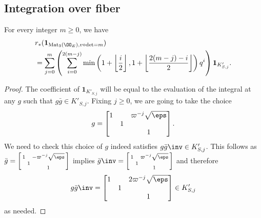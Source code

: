 \subsection{Integration over fiber}
\begin{proposition}
  For every integer $m \ge 0$, we have
  \begin{align*}
    &r_\ast(\mathbf{1}_{\Mat_3(\OO_E), v\circ\det=m}) \\
    &= \sum_{j=0}^m \left(
      \sum_{i=0}^{2(m-j)} \min \left( 1 + \left\lfloor \frac i2 \right\rfloor,
        1 + \left\lfloor \frac{2(m-j)-i}{2} \right\rfloor \right) q^i \right)
        \mathbf{1}_{K'_{S,j}}.
  \end{align*}
\end{proposition}
\begin{proof}
  The coefficient of $\mathbf{1}_{K'_{S,j}}$ will be equal to
  the evaluation of the integral at any $g$ such that $g\bar{g} \in K'_{S,j}$.
  Fixing $j \ge 0$, we are going to take the choice
  \[
    g = \begin{bmatrix}
      1 &   & \varpi^{-j} \sqrt{\eps} \\
      & 1 \\
      &   & 1
    \end{bmatrix}.
  \]
  We need to check this choice of $g$ indeed satisfies $g\bar{g}\inv \in K'_{S,j}$.
  This follows as
  $\bar{g} = \left[ \begin{smallmatrix} 1 &   & -\varpi^{-j} \sqrt{\eps} \\ & 1 \\ &   & 1 \end{smallmatrix} \right]$
  implies
  $\bar{g}\inv = \left[ \begin{smallmatrix} 1 &   & \varpi^{-j} \sqrt{\eps} \\ & 1 \\ &   & 1 \end{smallmatrix} \right]$
  and therefore
  \[
    g\bar{g}\inv = \begin{bmatrix}
      1 &   & 2\varpi^{-j} \sqrt{\eps} \\
      & 1 \\
      &   & 1
    \end{bmatrix} \in K'_{S,j}
  \]
  as needed.


\end{proof}
